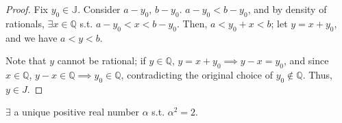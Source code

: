 \documentclass[12pt]{article}
\begin{document}
\begin{proof}[Proof]
  Fix $y_0 \in \mathbb{J}$. Consider $a - y_0$, $b - y_0$. $a - y_0 < b - y_0$, and by density of rationals, $\exists x \in \mathbb{Q}$ s.t. $a - y_0 < x < b - y_0$. Then, $a < y_0 + x < b$; let $y = x+y_0$, and we have $a < y < b$.

  Note that $y$ cannot be rational; if $y \in \mathbb{Q}$, $y = x + y_0 \implies y - x = y_0$, and since $x \in \mathbb{Q}$, $y - x \in \mathbb{Q} \implies y_0 \in \mathbb{Q}$, contradicting the original choice of $y_0 \notin \mathbb{Q}$. Thus, $y \in J$.
\end{proof}

\begin{theorem}
  $\exists$ a unique positive real number $\alpha$ s.t. $\alpha^2 = 2$.
\end{theorem}
\end{document}

